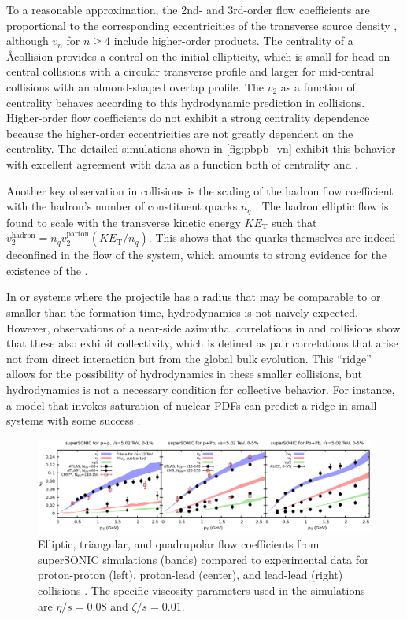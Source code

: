 To a reasonable approximation, the 2nd- and 3rd-order flow coefficients are proportional to the corresponding eccentricities of the transverse source density \cite{Qiu:2011iv}, although $v_n$ for $n \geq 4$ include higher-order products.
The centrality of a \AA collision provides a control on the initial ellipticity, which is small for head-on central collisions with a circular transverse profile and larger for mid-central collisions with an almond-shaped overlap profile.
The $v_2$ as a function of centrality behaves according to this hydrodynamic prediction in \PbPb collisions.
Higher-order flow coefficients do not exhibit a strong centrality dependence because the higher-order eccentricities are not greatly dependent on the centrality.
The detailed simulations shown in \cref{fig:pbpb_vn} exhibit this behavior with excellent agreement with data as a function both of centrality and \pt.

Another key observation in \AuAu collisions is the scaling of the hadron flow coefficient with the hadron's number of constituent quarks $n_q$ \cite{Adare:2006ti}.
The hadron elliptic flow is found to scale with the transverse kinetic energy $KE_\mathrm{T}$ such that $v_2^\textrm{hadron} = n_q v_2^\textrm{parton} \left(KE_\mathrm{T} / n_q\right)$.
This shows that the quarks themselves are indeed deconfined in the flow of the system, which amounts to strong evidence for the existence of the \qgp.

In \pp or \pA systems where the projectile has a radius that may be comparable to or smaller than the formation time, hydrodynamics is not na\"ively expected.
However, observations of a near-side azimuthal correlations in \pPb \cite{Abelev:2012ola,CMS-HIN-12-005,HION-2013-04} and \pp \cite{CMS-QCD-10-002,HION-2015-09} collisions show that these also exhibit collectivity, which is defined as pair correlations that arise not from direct interaction but from the global bulk evolution.
This ``ridge'' allows for the possibility of hydrodynamics in these smaller collisions, but hydrodynamics is not a necessary condition for collective behavior.
For instance, a \cgc model that invokes saturation of nuclear \acp{PDF} can predict a ridge in small systems with some success \cite{Dusling:2012cg,Dusling:2012wy,Dusling:2013qoz,McLerran:2013una,Kovchegov:2014yza}.

\begin{figure}[t]
  \includegraphics[width=\linewidth]{vn_all.png}
  \caption{Elliptic, triangular, and quadrupolar flow coefficients from superSONIC simulations (bands) compared to experimental data for proton-proton (left), proton-lead (center), and lead-lead (right) collisions \cite{Weller:2017tsr}. The specific viscosity parameters used in the simulations are $\eta/s = 0.08$ and $\zeta/s = 0.01$.}
  \label{fig:vn_all}
\end{figure}

